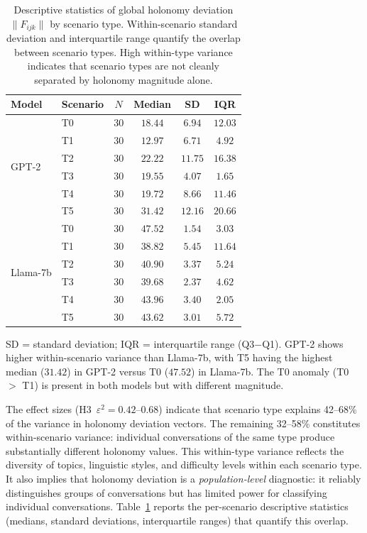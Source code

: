 \begin{table}[h]
\centering
\caption{Descriptive statistics of global holonomy deviation $\|F_{ijk}\|$ by scenario type.
Within-scenario standard deviation and interquartile range quantify the overlap between
scenario types. High within-type variance indicates that scenario types are not cleanly
separated by holonomy magnitude alone.}
\label{tab:descriptive-stats}
\small
\begin{tabular}{@{}llcccc@{}}
\toprule
\textbf{Model} & \textbf{Scenario} & $N$ & \textbf{Median} & \textbf{SD} & \textbf{IQR} \\
\midrule
\multirow{6}{*}{GPT-2}
& T0 & 30 & $18.44$ & $6.94$ & $12.03$ \\
& T1 & 30 & $12.97$ & $6.71$ & $4.92$ \\
& T2 & 30 & $22.22$ & $11.75$ & $16.38$ \\
& T3 & 30 & $19.55$ & $4.07$ & $1.65$ \\
& T4 & 30 & $19.72$ & $8.66$ & $11.46$ \\
& T5 & 30 & $31.42$ & $12.16$ & $20.66$ \\
\midrule
\multirow{6}{*}{Llama-7b}
& T0 & 30 & $47.52$ & $1.54$ & $3.03$ \\
& T1 & 30 & $38.82$ & $5.45$ & $11.64$ \\
& T2 & 30 & $40.90$ & $3.37$ & $5.24$ \\
& T3 & 30 & $39.68$ & $2.37$ & $4.62$ \\
& T4 & 30 & $43.96$ & $3.40$ & $2.05$ \\
& T5 & 30 & $43.62$ & $3.01$ & $5.72$ \\
\bottomrule
\end{tabular}

\medskip
{\footnotesize SD = standard deviation; IQR = interquartile range (Q3$-$Q1).
GPT-2 shows higher within-scenario variance than Llama-7b, with T5 having the
highest median ($31.42$) in GPT-2 versus T0 ($47.52$) in Llama-7b. The T0 anomaly
(T0 $>$ T1) is present in both models but with different magnitude.}
\end{table}

\begin{remark}
\label{rem:within-variance}
The effect sizes (H3~$\varepsilon^2 = 0.42$--$0.68$) indicate that scenario type explains
42--68\% of the variance in holonomy deviation vectors. The remaining 32--58\%
constitutes within-scenario variance: individual conversations of the same type produce
substantially different holonomy values. This within-type variance reflects the diversity
of topics, linguistic styles, and difficulty levels within each scenario type. It also
implies that holonomy deviation is a \emph{population-level} diagnostic: it reliably
distinguishes groups of conversations but has limited power for classifying individual
conversations. Table~\ref{tab:descriptive-stats} reports the per-scenario descriptive
statistics (medians, standard deviations, interquartile ranges) that quantify this overlap.
\end{remark}


